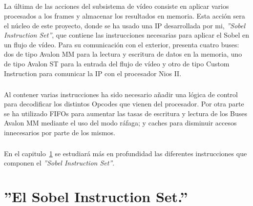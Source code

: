 \documentclass[a4paper,12pt,titlepage,final]{book}
\begin{document}
\subsubsection*{}
\paragraph{}
La última de las acciones del subsistema de vídeo consiste en aplicar varios procesados a los frames y almacenar los resultados en memoria. Esta acción sera el núcleo de este proyecto, donde se ha usado una IP desarrollada por mi, \textit{''Sobel Instruction Set''}, que contiene las instrucciones necesarias para aplicar el Sobel en un flujo de vídeo. Para su comunicación con el exterior, presenta cuatro buses: dos de tipo Avalon MM para la lectura y escritura de datos en la memoria, uno de tipo Avalon ST para la entrada del flujo de vídeo y otro de tipo Custom Instruction para comunicar la IP con el procesador Nios II. 

\paragraph{}
Al contener varias instrucciones ha sido necesario añadir una lógica de control para decodificar los distintos Opcodes que vienen del procesador. Por otra parte se ha utilizado FIFOs para aumentar las tasas de escritura y lectura de los Buses Avalon MM mediante el uso del modo ráfaga; y caches para disminuir accesos innecesarios por parte de los mismos.

\paragraph{}
En el capitulo~\ref{sec:SIS} se estudiará más en profundidad las diferentes instrucciones que componen el \textit{''Sobel Instruction Set''}.

\chapter{''El Sobel Instruction Set.''} \label{sec:SIS}
\section*{}
\subsection*{}
\subsubsection*{}
\end{document}
